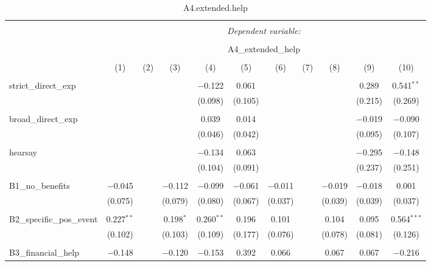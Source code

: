
\begin{table}[H] \centering 
  \caption{A4.extended.help} 
  \label{} 
\tiny 
\begin{tabular}{@{\extracolsep{4pt}}lcccccccccc} 
\\[-1.8ex]\hline 
\hline \\[-1.8ex] 
 & \multicolumn{10}{c}{\textit{Dependent variable:}} \\ 
\cline{2-11} 
\\[-1.8ex] & \multicolumn{10}{c}{A4\_extended\_help} \\ 
\\[-1.8ex] & (1) & (2) & (3) & (4) & (5) & (6) & (7) & (8) & (9) & (10)\\ 
\hline \\[-1.8ex] 
 strict\_direct\_exp &  &  &  & $-$0.122 & 0.061 &  &  &  & 0.289 & 0.541$^{**}$ \\ 
  &  &  &  & (0.098) & (0.105) &  &  &  & (0.215) & (0.269) \\ 
  & & & & & & & & & & \\ 
 broad\_direct\_exp &  &  &  & 0.039 & 0.014 &  &  &  & $-$0.019 & $-$0.090 \\ 
  &  &  &  & (0.046) & (0.042) &  &  &  & (0.095) & (0.107) \\ 
  & & & & & & & & & & \\ 
 hearsay &  &  &  & $-$0.134 & 0.063 &  &  &  & $-$0.295 & $-$0.148 \\ 
  &  &  &  & (0.104) & (0.091) &  &  &  & (0.237) & (0.251) \\ 
  & & & & & & & & & & \\ 
 B1\_no\_benefits & $-$0.045 &  & $-$0.112 & $-$0.099 & $-$0.061 & $-$0.011 &  & $-$0.019 & $-$0.018 & 0.001 \\ 
  & (0.075) &  & (0.079) & (0.080) & (0.067) & (0.037) &  & (0.039) & (0.039) & (0.037) \\ 
  & & & & & & & & & & \\ 
 B2\_specific\_pos\_event & 0.227$^{**}$ &  & 0.198$^{*}$ & 0.260$^{**}$ & 0.196 & 0.101 &  & 0.104 & 0.095 & 0.564$^{***}$ \\ 
  & (0.102) &  & (0.103) & (0.109) & (0.177) & (0.076) &  & (0.078) & (0.081) & (0.126) \\ 
  & & & & & & & & & & \\ 
 B3\_financial\_help & $-$0.148 &  & $-$0.120 & $-$0.153 & 0.392 & 0.066 &  & 0.067 & 0.067 & $-$0.216 \\ 

\end{tabular}
\end{table}
